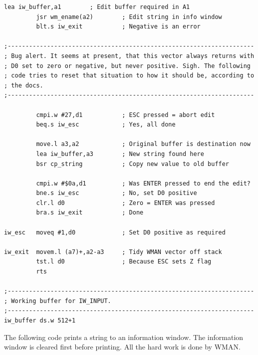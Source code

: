\begin{lstlisting}[firstnumber=1,caption={QlToday\_pe\_utilities\_asm}]
         lea iw_buffer,a1        ; Edit buffer required in A1
         jsr wm_ename(a2)        ; Edit string in info window
         blt.s iw_exit           ; Negative is an error

;---------------------------------------------------------------------
; Bug alert. It seems at present, that this vector always returns with
; D0 set to zero or negative, but never positive. Sigh. The following
; code tries to reset that situation to how it should be, according to
; the docs.
;---------------------------------------------------------------------

         cmpi.w #27,d1           ; ESC pressed = abort edit
         beq.s iw_esc            ; Yes, all done

         move.l a3,a2            ; Original buffer is destination now
         lea iw_buffer,a3        ; New string found here
         bsr cp_string           ; Copy new value to old buffer

         cmpi.w #$0a,d1          ; Was ENTER pressed to end the edit?
         bne.s iw_esc            ; No, set D0 positive
         clr.l d0                ; Zero = ENTER was pressed
         bra.s iw_exit           ; Done

iw_esc   moveq #1,d0             ; Set D0 positive as required

iw_exit  movem.l (a7)+,a2-a3     ; Tidy WMAN vector off stack
         tst.l d0                ; Because ESC sets Z flag
         rts

;---------------------------------------------------------------------
; Working buffer for IW_INPUT.
;---------------------------------------------------------------------
iw_buffer ds.w 512+1
\end{lstlisting}

The following code prints a string to an information window. The
    information window is cleared first before printing. All the hard work is
    done by WMAN.

